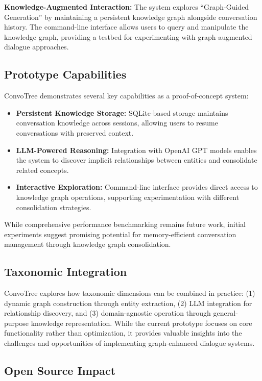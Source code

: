 \documentclass[11pt]{article}
\begin{document}
\textbf{Knowledge-Augmented Interaction:} The system explores ``Graph-Guided Generation'' by maintaining a persistent knowledge graph alongside conversation history. The command-line interface allows users to query and manipulate the knowledge graph, providing a testbed for experimenting with graph-augmented dialogue approaches.

\subsection{Prototype Capabilities}

ConvoTree demonstrates several key capabilities as a proof-of-concept system:

\begin{itemize}
\item \textbf{Persistent Knowledge Storage:} SQLite-based storage maintains conversation knowledge across sessions, allowing users to resume conversations with preserved context.
\item \textbf{LLM-Powered Reasoning:} Integration with OpenAI GPT models enables the system to discover implicit relationships between entities and consolidate related concepts.
\item \textbf{Interactive Exploration:} Command-line interface provides direct access to knowledge graph operations, supporting experimentation with different consolidation strategies.
\end{itemize}

While comprehensive performance benchmarking remains future work, initial experiments suggest promising potential for memory-efficient conversation management through knowledge graph consolidation.

\subsection{Taxonomic Integration}

ConvoTree explores how taxonomic dimensions can be combined in practice: (1) dynamic graph construction through entity extraction, (2) LLM integration for relationship discovery, and (3) domain-agnostic operation through general-purpose knowledge representation. While the current prototype focuses on core functionality rather than optimization, it provides valuable insights into the challenges and opportunities of implementing graph-enhanced dialogue systems.

\subsection{Open Source Impact}
\end{document}
